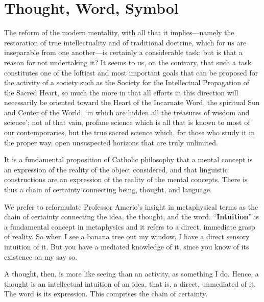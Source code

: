 \section{Thought, Word, Symbol}

\begin{quotex}
The reform of the modern mentality, with all that it implies---namely the restoration of true intellectuality and of traditional doctrine, which for us are inseparable from one another---is certainly a considerable task; but is that a reason for not undertaking it? It seems to us, on the contrary, that such a task constitutes one of the loftiest and most important goals that can be proposed for the activity of a society such as the Society for the Intellectual Propagation of the Sacred Heart, so much the more in that all efforts in this direction will necessarily be oriented toward the Heart of the Incarnate Word, the spiritual Sun and Center of the World, `in which are hidden all the treasures of wisdom and science'; not of that vain, profane science which is all that is known to most of our contemporaries, but the true sacred science which, for those who study it in the proper way, open unsuspected horizons that are truly unlimited.
\end{quotex}


\begin{quotex}
It is a fundamental proposition of Catholic philosophy that a mental concept is an expression of the reality of the object considered, and that linguistic constructions are an expression of the reality of the mental concepts. There is thus a chain of certainty connecting being, thought, and language.
\end{quotex}


We prefer to reformulate Professor Amerio's insight in metaphysical terms as the chain of certainty connecting the idea, the thought, and the word. ``\textbf{Intuition}'' is a fundamental concept in metaphysics and it refers to a direct, immediate grasp of reality. So when I see a banana tree out my window, I have a direct sensory intuition of it. But you have a mediated knowledge of it, since you know of its existence on my say so.

A thought, then, is more like seeing than an activity, as something I do. Hence, a thought is an intellectual intuition of an idea, that is, a direct, unmediated of it. The word is its expression. This comprises the chain of certainty.


